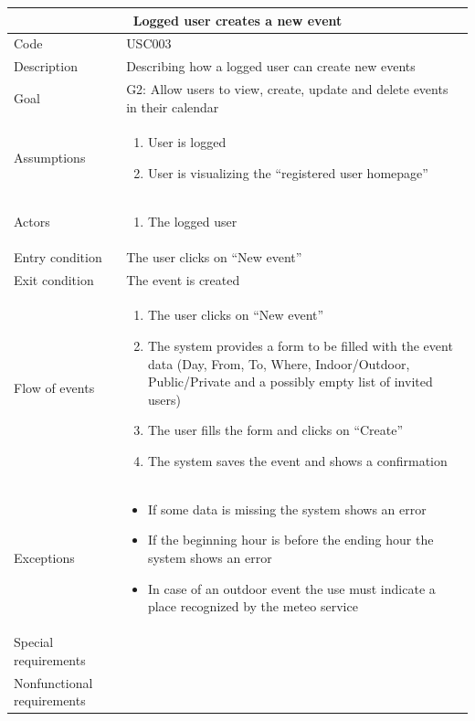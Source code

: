 \documentclass[10pt,a4paper,titlepage]{article}
\begin{document}
\begin{tabular}[h]{| p{3cm} | p{10cm} |}
\hline \multicolumn{2}{|c|}{\textbf{Logged user creates a new event}} \\ 
\hline Code & USC003 \\ 
\hline Description & Describing how a logged user can create new events \\
\hline Goal & G2: Allow users to view, create, update and delete events in their calendar\\
\hline Assumptions  & \begin{enumerate}
\item User is logged
\item User is visualizing the “registered user homepage”
\end{enumerate} \\
\hline Actors &  \begin{enumerate}
\item The logged user
\end{enumerate} \\
\hline Entry condition & The user clicks on “New event” \\
\hline Exit condition & The event is created \\
\hline Flow of events & \begin{enumerate}
\item The user clicks on “New event”
\item The system provides a form to be filled with the event data (Day, From, To, Where, Indoor/Outdoor, Public/Private and a possibly empty list of invited users)
\item The user fills the form and clicks on “Create”
\item The system saves the event and shows a confirmation
\end{enumerate}\\
\hline Exceptions & \begin{itemize}
\item If some data is missing the system shows an error
\item  If the beginning hour is before the ending hour the system shows an error
\item In case of an outdoor event the use must indicate a place recognized by the meteo service
\end{itemize}\\
\hline Special requirements &  \\
\hline Nonfunctional requirements &  \\
\hline
\end{tabular}
\end{document}
